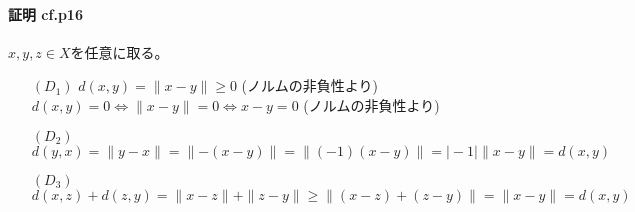 \documentclass[12pt,a4paper]{article}
\begin{document}
        \paragraph{証明 cf.p16}
          $x, y, z \in X$を任意に取る。
          \begin{itemize}
            \item[$(D_1)$] $d(x, y) = \parallel x - y\parallel \geq 0$ (ノルムの非負性より) \\
              $d(x, y) = 0 \Leftrightarrow \parallel x -y \parallel = 0 \Leftrightarrow x - y = 0$ (ノルムの非負性より)
            \item[$(D_2)$]  $d(y, x) = \parallel y - x \parallel = \parallel - (x - y) \parallel = \parallel (-1) (x -y) \parallel = \mid -1 \mid \parallel x - y \parallel = d(x, y)$
            \item[$(D_3)$] $d(x, z) + d(z, y) = \parallel x - z \parallel + \parallel z - y \parallel \geq \parallel (x - z) + (z - y) \parallel = \parallel x - y \parallel = d(x, y)$
          \end{itemize}

        
\end{document}
